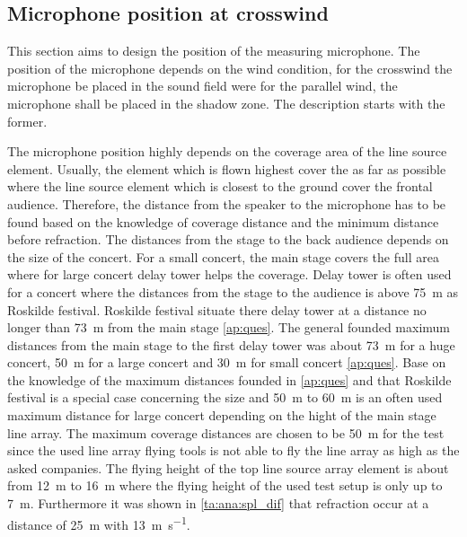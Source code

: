 \subsection{Microphone position at crosswind}
This section aims to design the position of the measuring microphone. The position of the microphone depends on the wind condition, for the crosswind the microphone be placed in the sound field were for the parallel wind, the microphone shall be placed in the shadow zone. The description starts with the former.


The microphone position highly depends on the coverage area of the line source element. Usually, the element which is flown highest cover the as far as possible where the line source element which is closest to the ground cover the frontal audience. Therefore, the distance from the speaker to the microphone has to be found based on the knowledge of coverage distance and the minimum distance before refraction. The distances from the stage to the back audience depends on the size of the concert. For a small concert, the main stage covers the full area where for large concert delay tower helps the coverage. Delay tower is often used for a concert where the distances from the stage to the audience is above \SI{75}{\meter} as Roskilde festival. Roskilde festival situate there delay tower at a distance no longer than \SI{73}{\meter} from the main stage \autoref{ap:ques}. The general founded maximum distances from the main stage to the first delay tower was about \SI{73}{\meter} for a huge concert, \SI{50}{\meter} for a large concert and \SI{30}{\meter} for small concert \autoref{ap:ques}. Base on the knowledge of the maximum distances founded in \autoref{ap:ques} and that Roskilde festival is a special case concerning the size and \SI{50}{\meter} to \SI{60}{\meter} is an often used maximum distance for large concert depending on the hight of the main stage line array. The maximum coverage distances are chosen to be \SI{50}{\meter} for the test since the used line array flying tools is not able to fly the line array as high as the asked companies. The flying height of the top line source array element is about from \SI{12}{\meter} to \SI{16}{\meter} where the flying height of the used test setup is only up to \SI{7}{\meter}.  Furthermore it was shown in \autoref{ta:ana:spl_dif} that refraction occur at a distance of \SI{25}{\meter} with \SI{13}{\meter\per\second}.

